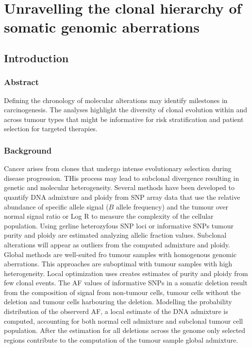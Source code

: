 \chapter{Unravelling the clonal hierarchy of somatic genomic aberrations}

\section{Introduction}

	\subsection{Abstract}
	Defining the chronology of molecular alterations may identify milestones in carcinogenesis.
	The analyses highlight the diversity of clonal evolution within and across tumour types that might be informative for risk stratification and patient selection for targeted therapies.

	\subsection{Background}
	Cancer arises from clones that undergo intense evolutionary selection during disease progression.
	THis process may lead to subclonal divergence resulting in genetic and molecular heterogeneity.
	Several methods have been developed to quantify DNA admixture and ploidy from SNP array data that use the relative abundance of specific allele signal ($B$ allele frequency) and the tumour over normal signal ratio or Log R to measure the complexity of the cellular population.
	Using gerline heterozyfous SNP loci or informative SNPs tumour purity and ploidy are estimated analyzing allelic fraction values.
	Subclonal alterations will appear as outliers from the computed admixture and ploidy.
	Global methods are well-suited fro tumour samples with homogenous genomic aberrations.
	This approaches are suboptimal with tumour samples with high heterogeneity.
	Local optimization uses creates estimates of purity and ploidy from few clonal events.
	The AF values of informative SNPs in a somatic deletion result from the composition of signal from non-tumour cells, tumour cells without the deletion and tumour cells harbouring the deletion.
	Modelling the probability distribution of the observerd AF, a local estimate of the DNA admixture is computed, accounting for both normal cell admixture and subclonal tumour cell population.
	After the estimation for all deletions across the genome only selected regions contribute to the computation of the tumour sample global admixture.

